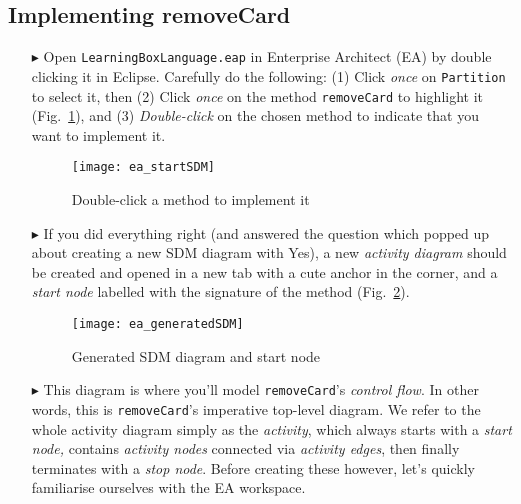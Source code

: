 \newpage
\hypertarget{remCard vis}{}
\subsection{Implementing removeCard}
\visHeader

\begin{itemize}

\item[$\blacktriangleright$] Open \texttt{LearningBoxLanguage.eap} in Enterprise Architect (EA) by dou\-ble clicking it in Eclipse. Carefully do the
following: (1) Click \emph{once} on \texttt{Partition} to select it, then (2) Click \emph{once} on the method \texttt{removeCard} to highlight it
(Fig.~\ref{ea:sdm_start}), and (3) \emph{Double-click} on the chosen method to indicate that you want to implement it.

\begin{figure}[htp]
\begin{center}
  \texttt{[image: ea\_startSDM]}
  \caption{Double-click a method to implement it}  
  \label{ea:sdm_start}
\end{center}
\end{figure}
 
\item[$\blacktriangleright$] If you did everything right (and answered the question which popped up about creating a new SDM diagram with Yes), a new \emph{activity diagram} should be created and opened in a new tab with a cute anchor in
the corner, and a \emph{start node} labelled with the signature of the method (Fig.~\ref{ea:sdm_skeleton}).  

\begin{figure}[htp]
\begin{center}
 \texttt{[image: ea\_generatedSDM]}
  \caption{Generated SDM diagram and start node}  
  \label{ea:sdm_skeleton}
\end{center}
\end{figure}

\vspace{0.5cm}

\item[$\blacktriangleright$] This diagram is where you'll model \texttt{removeCard}'s \emph{control flow}. In other words,
this is \texttt{removeCard}'s imperative top-level diagram. We refer to the whole activity diagram simply as the \emph{activity}, which always starts with a
\emph{start node,} contains \emph{activity nodes} connected via \emph{activity edges}, then finally terminates with a \emph{stop node}. Before creating
these however, let's quickly familiarise ourselves with the EA workspace.


\end{itemize}

